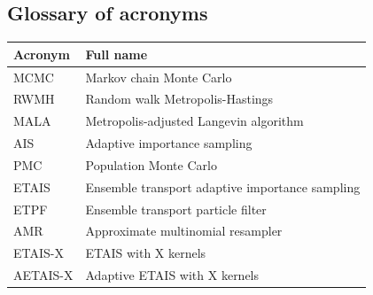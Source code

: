 \documentclass[final]{siamltex}
\begin{document}
\begin{appendix}

\section{Glossary of acronyms}

\begin{table}[h!]
\centering
\begin{tabular}{|l|l|}
\hline
Acronym & Full name                              \\ \hline
MCMC    & Markov chain Monte Carlo               \\
RWMH    & Random walk Metropolis-Hastings        \\
MALA    & Metropolis-adjusted Langevin algorithm \\
AIS     & Adaptive importance sampling           \\
PMC     & Population Monte Carlo                 \\
ETAIS    & Ensemble transport adaptive importance sampling  \\
ETPF    & Ensemble transport particle filter     \\
AMR     & Approximate multinomial resampler      \\
ETAIS-X  & ETAIS with X kernels                    \\
AETAIS-X & Adaptive ETAIS with X kernels          \\ \hline
\end{tabular}
\end{table}

\end{appendix}



\end{document}
